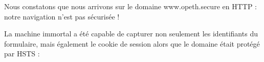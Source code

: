Nous constatons que nous arrivons sur le domaine www.opeth.secure en HTTP : notre navigation n'est pas sécurisée !

\begin{figure}[H]
\end{figure}

La machine immortal a été capable de capturer non seulement les identifiants du formulaire, mais également le cookie de session alors que le domaine était protégé par HSTS :

\begin{figure}[H]
\end{figure}
